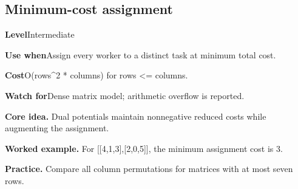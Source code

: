 \documentclass[10pt,letterpaper]{article}
\newcommand{\entrylabel}[1]{\textcolor{accent}{\bfseries #1}}
\begin{document}
\subsection{Minimum-cost assignment}
\begin{guidebox}\small
\entrylabel{Level}\quad Intermediate\par
\entrylabel{Use when}\quad Assign every worker to a distinct task at minimum total cost.\par
\entrylabel{Cost}\quad O(rows\textasciicircum{}2 * columns) for rows <= columns.\par
\entrylabel{Watch for}\quad Dense matrix model; arithmetic overflow is reported.\par
\end{guidebox}
\noindent\textbf{Core idea.} Dual potentials maintain nonnegative reduced costs while augmenting the assignment.\par
\noindent\textbf{Worked example.} For [[4,1,3],[2,0,5]], the minimum assignment cost is 3.\par
\noindent\textbf{Practice.} Compare all column permutations for matrices with at most seven rows.\par
\end{document}
